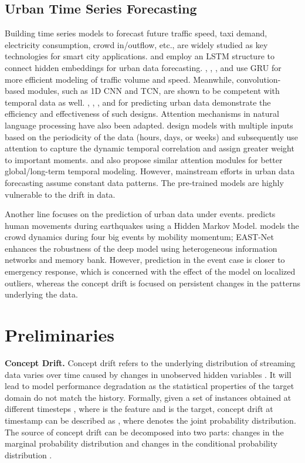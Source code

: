 \documentclass[sigconf]{acmart}
\begin{document}
\subsection{Urban Time Series Forecasting}
Building time series models to forecast future traffic speed, taxi demand, electricity consumption, crowd in/outflow, etc., are widely studied as key technologies for smart city applications. \cite{yao2018deep} and \cite{cui2019traffic} employ an LSTM structure to connect hidden embeddings for urban data forecasting. \cite{lai2018modeling}, \cite{li2018diffusion}, \cite{bai2020adaptive}, and \cite{zhao2019t} use GRU for more efficient modeling of traffic volume and speed.  Meanwhile, convolution-based modules, such as 1D CNN and TCN, are shown to be competent with temporal data as well. \cite{yu2018spatio}, \cite{shih2019temporal}, \cite{wu2019graph}, and \cite{wu2020connecting} for predicting urban data demonstrate the efficiency and effectiveness of such designs. Attention mechanisms in natural language processing have also been adapted. \cite{yao2019revisiting,guo2019attention} design models with multiple inputs based on the periodicity of the data (hours, days, or weeks) and subsequently use attention to capture the dynamic temporal correlation and assign greater weight to important moments. \cite{zheng2020gman} and \cite{xu2020spatial} also propose similar attention modules for better global/long-term temporal modeling. However, mainstream efforts in urban data forecasting assume constant data patterns. The pre-trained models are highly vulnerable to the drift in data.

Another line focuses on the prediction of urban data under events. \cite{song2014prediction} predicts human movements during earthquakes using a Hidden Markov Model. \cite{jiang2019deepurbanevent,jiang2023learning} models the crowd dynamics during four big events by mobility momentum; EAST-Net \cite{wang2022event} enhances the robustness of the deep model using heterogeneous information networks and memory bank. However, prediction in the event case is closer to emergency response, which is concerned with the effect of the model on localized outliers, whereas the concept drift is focused on persistent changes in the patterns underlying the data.

\section{Preliminaries}
\textbf{Concept Drift.} Concept drift refers to the underlying distribution of streaming data varies over time caused by changes in unobserved hidden variables \cite{lu2018learning}. It will lead to model performance degradation as the statistical properties of the target domain do not match the history. Formally, given a set of instances obtained at different timesteps , where  is the feature and  is the target, concept drift at timestamp  can be described as , where  denotes the joint probability distribution. The source of concept drift can be decomposed into two parts: changes in the marginal probability distribution  and changes in the conditional probability distribution .
\end{document}
